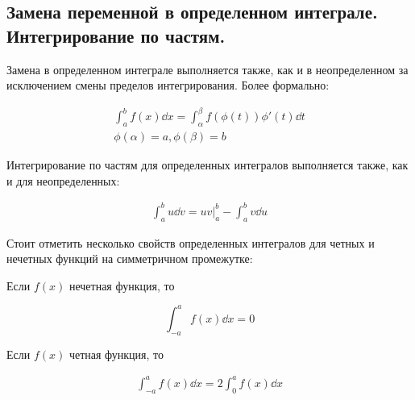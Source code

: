\subsection{%
  Замена переменной в определенном интеграле. Интегрирование по частям.%
}

Замена в определенном интеграле выполняется также, как и в неопределенном за
исключением смены пределов интегрирования. Более формально:

\begin{align*}
  \int_{a}^{b} f(x) \dd x = \int_{\alpha}^{\beta} f(\phi(t)) \phi'(t) \dd t \\
  \phi(\alpha) = a, \phi(\beta) = b
\end{align*}

Интегрирование по частям для определенных интегралов выполняется также, как и
для неопределенных:

\begin{align*}
  \int_{a}^{b} u \dd v = u v \bigg\vert_{a}^{b} - \int_{a}^{b} v \dd u
\end{align*}

Стоит отметить несколько свойств определенных интегралов для четных и нечетных
функций на симметричном промежутке:

\begin{twocolumns}
  \begin{lemma}
    Если \(f(x)\) нечетная функция, то

    \begin{equation*}
      \int_{-a}^{a} f(x) \dd x = 0
    \end{equation*}
  \end{lemma}
  
  \begin{lemma}
    Если \(f(x)\) четная функция, то
    
    \begin{align*}
      \int_{-a}^{a} f(x) \dd x = 2 \int_{0}^{a} f(x) \dd x
    \end{align*}
  \end{lemma}  
\end{twocolumns}


